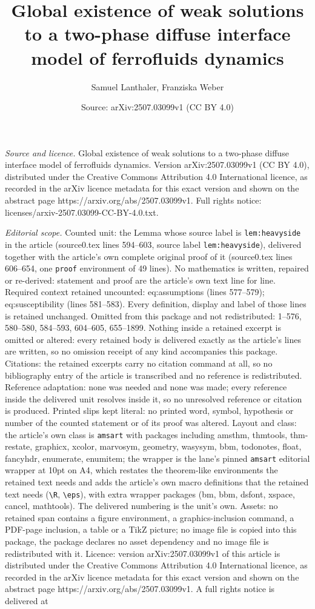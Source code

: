 \documentclass[10pt,a4paper]{amsart}
\title[Global existence of weak solutions to a two-phase diffuse in]{Global existence of weak solutions to a two-phase diffuse interface model of ferrofluids dynamics}
\author{Samuel Lanthaler, Franziska Weber}
\date{Source: arXiv:2507.03099v1 (CC BY 4.0)}
\begin{document}
\maketitle

\noindent\emph{Source and licence.} Global existence of weak solutions to a two-phase diffuse interface model of ferrofluids dynamics. Version arXiv:2507.03099v1 (CC BY 4.0), distributed under the Creative Commons Attribution 4.0 International licence, as recorded in the arXiv licence metadata for this exact version and shown on the abstract page https://arxiv.org/abs/2507.03099v1. Full rights notice: licenses/arxiv-2507.03099-CC-BY-4.0.txt.\par\smallskip

\noindent\textit{Editorial scope.} Counted unit: the Lemma whose source label is \texttt{lem:heavyside} in the article (source0.tex lines 594--603, source label \texttt{lem:heavyside}), delivered together with the article's own complete original proof of it (source0.tex lines 606--654, one \texttt{proof} environment of 49 lines). No mathematics is written, repaired or re-derived: statement and proof are the article's own text line for line. Required context retained uncounted: eq:assumptions (lines 577--579); eq:susceptibility (lines 581--583). Every definition, display and label of those lines is retained unchanged. Omitted from this package and not redistributed: 1--576, 580--580, 584--593, 604--605, 655--1899. Nothing inside a retained excerpt is omitted or altered: every retained body is delivered exactly as the article's lines are written, so no omission receipt of any kind accompanies this package. Citations: the retained excerpts carry no citation command at all, so no bibliography entry of the article is transcribed and no reference is redistributed. Reference adaptation: none was needed and none was made; every reference inside the delivered unit resolves inside it, so no unresolved reference or citation is produced. Printed slips kept literal: no printed word, symbol, hypothesis or number of the counted statement or of its proof was altered. Layout and class: the article's own class is \texttt{amsart} with packages including amsthm, thmtools, thm-restate, graphicx, xcolor, marvosym, geometry, wasysym, bbm, todonotes, float, fancyhdr, enumerate, enumitem; the wrapper is the lane's pinned \texttt{amsart} editorial wrapper at 10pt on A4, which restates the theorem-like environments the retained text needs and adds the article's own macro definitions that the retained text needs (\texttt{\textbackslash R}, \texttt{\textbackslash eps}), with extra wrapper packages (bm, bbm, dsfont, xspace, cancel, mathtools). The delivered numbering is the unit's own. Assets: no retained span contains a figure environment, a graphics-inclusion command, a PDF-page inclusion, a table or a TikZ picture; no image file is copied into this package, the package declares no asset dependency and no image file is redistributed with it. Licence: version arXiv:2507.03099v1 of this article is distributed under the Creative Commons Attribution 4.0 International licence, as recorded in the arXiv licence metadata for this exact version and shown on the abstract page https://arxiv.org/abs/2507.03099v1. A full rights notice is delivered at 
\end{document}
